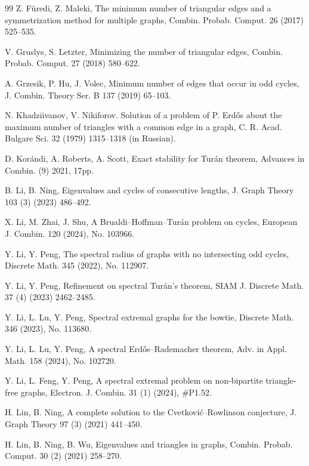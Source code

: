 \documentclass[11pt]{article}
\begin{document}
\begin{thebibliography}{99}
Z. F\"{u}redi, Z. Maleki, 
The minimum number of triangular edges and a symmetrization
method for multiple graphs, 
Combin. Probab.  Comput. 26 (2017)  525--535.  


V. Gruslys, S. Letzter, 
Minimizing the number of triangular edges, 
Combin. Probab.  Comput. 27 (2018) 580--622. 

A. Grzesik, P. Hu, J. Volec, 
Minimum number of edges that occur in odd cycles, 
J. Combin. Theory Ser. B 137 (2019) 65--103. 


N. Khadziivanov, V. Nikiforov.
Solution of a problem of {P. Erd\H{o}s} 
about the maximum number of
  triangles with a common edge in a graph, 
C. R. Acad. Bulgare Sci. 32 (1979) 1315--1318 (in Russian). 

D. Kor\'{a}ndi, A. Roberts, A. Scott, 
Exact stability for Tur\'{a}n theorem, 
Advances in Combin. (9) 2021, 17pp. 


B. Li, B. Ning,  
Eigenvalues and cycles of consecutive lengths, 
J. Graph Theory 103 (3) (2023) 486--492. 

X. Li, M. Zhai, J. Shu, 
A Brualdi--Hoffman--Tur\'{a}n problem on cycles, 
European J. Combin. 120 (2024), No. 103966. 

Y. Li, Y. Peng, 
The spectral radius of graphs with no intersecting odd cycles, 
Discrete Math. 345 (2022), No. 112907. 



 Y. Li, Y. Peng, 
 Refinement on  spectral Tur\'{a}n's theorem, 
 SIAM J. Discrete Math. 37 (4) (2023) 2462--2485.  
 
 
Y. Li, L. Lu, Y. Peng,
Spectral extremal graphs for the bowtie,
  Discrete Math. 346  (2023), No. 113680. 

Y. Li, L. Lu, Y. Peng, 
A spectral Erd\H{o}s--Rademacher theorem, 
Adv. in Appl. Math. 158 (2024), No. 102720. 

Y. Li, L. Feng, Y. Peng, 
A spectral extremal problem on non-bipartite triangle-free graphs, 
Electron. J. Combin. 31 (1) (2024), \#P1.52.  

H. Lin,  B. Ning, 
A complete solution to the Cvetkovi\'{c}--Rowlinson conjecture, 
J. Graph Theory 97 (3) (2021) 441--450.  


H. Lin, B. Ning, B. Wu, 
Eigenvalues and triangles in graphs, 
Combin. Probab. Comput. 30 (2) (2021) 258--270.  


\end{thebibliography}
\end{document}
